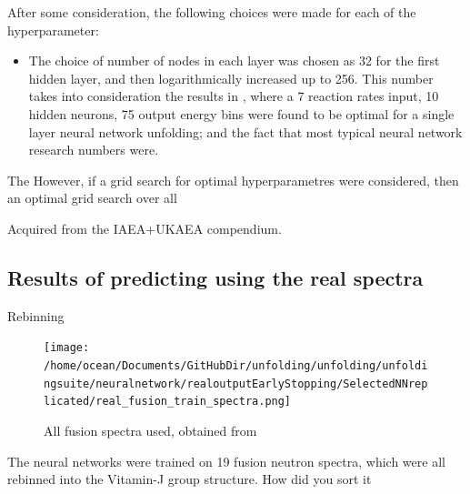 \documentclass[a4paper, 12pt]{article}
\begin{document}
After some consideration, the following choices were made for each of the hyperparameter:
\begin{itemize}
    \item The choice of number of nodes in each layer was chosen as 32 for the first hidden layer, and then logarithmically increased up to 256. This number takes into consideration the results in \cite{RDANNM}, where a 7 reaction rates input, 10 hidden neurons, 75 output energy bins were found to be optimal for a single layer neural network unfolding; and the fact that most typical neural network research numbers were.

\end{itemize}
    The 
    However, if a grid search for optimal hyperparametres were considered, then an optimal grid search over all 


Acquired from the IAEA+UKAEA compendium\cite{IAEAUKAEACompendium}.

\subsection{Results of predicting using the real spectra}
Rebinning

\begin{figure}
\centering
\texttt{[image: /home/ocean/Documents/GitHubDir/unfolding/unfolding/unfoldingsuite/neuralnetwork/realoutputEarlyStopping/SelectedNNreplicated/real\_fusion\_train\_spectra.png]}
\caption{All fusion spectra used, obtained from \cite{ukaea_unfolding_support_report_march2017}}\label{RealFusionTrain}
\end{figure}

The neural networks were trained on 19 fusion neutron spectra, which were all rebinned into the Vitamin-J group structure.
How did you sort it
\end{document}
